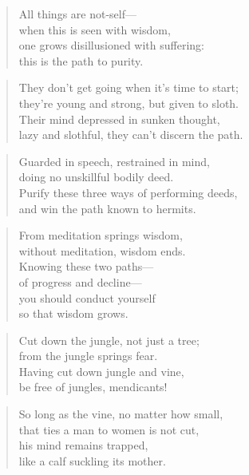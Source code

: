 \documentclass[12pt,openany]{book}%
\begin{document}
\begin{verse}%
All things are not-self—\\
when this is seen with wisdom, \\
one grows disillusioned with suffering: \\
this is the path to purity. 

%
\end{verse}

\begin{verse}%
They don’t get going when it’s time to start; \\
they’re young and strong, but given to sloth. \\
Their mind depressed in sunken thought, \\
lazy and slothful, they can’t discern the path. 

%
\end{verse}

\begin{verse}%
Guarded in speech, restrained in mind, \\
doing no unskillful bodily deed. \\
Purify these three ways of performing deeds, \\
and win the path known to hermits. 

%
\end{verse}

\begin{verse}%
From meditation springs wisdom, \\
without meditation, wisdom ends. \\
Knowing these two paths—\\
of progress and decline—\\
you should conduct yourself \\
so that wisdom grows. 

%
\end{verse}

\begin{verse}%
Cut down the jungle, not just a tree; \\
from the jungle springs fear. \\
Having cut down jungle and vine, \\
be free of jungles, mendicants! 

%
\end{verse}

\begin{verse}%
So long as the vine, no matter how small, \\
that ties a man to women is not cut, \\
his mind remains trapped, \\
like a calf suckling its mother. 

%
\end{verse}
\end{document}
